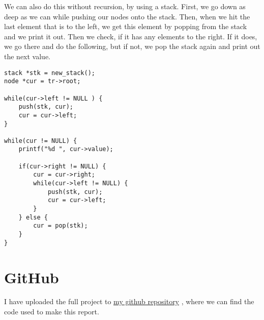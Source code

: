 \documentclass[a4paper,11pt]{article}
\newcommand{\underlinehref}[2]{%
    \href{#1}{\ul{#2}}%
}
\begin{document}
    We can also do this without recursion, by using a stack.
    First, we go down as deep as we can while pushing our nodes onto the stack.
    Then, when we hit the last element that is to the left, we get this element by popping from the stack and we print it out.
    Then we check, if it has any elements to the right.
    If it does, we go there and do the following, but if not, we pop the stack again and print out the next value.
    \begin{verbatim}
stack *stk = new_stack();
node *cur = tr->root;
    
while(cur->left != NULL ) {
    push(stk, cur);
    cur = cur->left;
}

while(cur != NULL) {
    printf("%d ", cur->value);

    if(cur->right != NULL) {
        cur = cur->right;
        while(cur->left != NULL) {
            push(stk, cur);
            cur = cur->left;
        }
    } else {
        cur = pop(stk);
    }
}
    \end{verbatim}


    \section*{GitHub}
    I have uploaded the full project to \underlinehref{https://github.com/peterherczku/ID1021/tree/main/assignment-7}{my github repository}, where we can find the code used to make this report.
\end{document}
